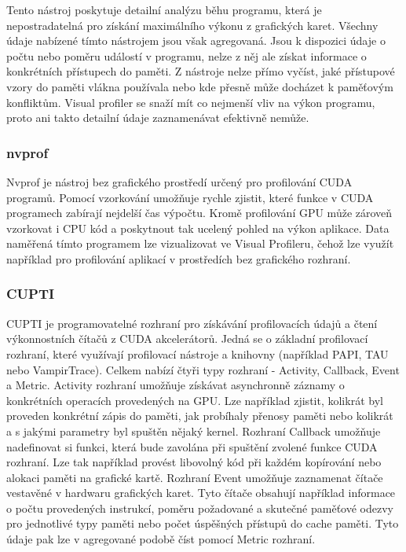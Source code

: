 Tento nástroj poskytuje detailní analýzu běhu programu, která je nepostradatelná pro získání maximálního výkonu z grafických karet. Všechny údaje nabízené tímto nástrojem jsou však agregovaná. Jsou k dispozici údaje o počtu nebo poměru událostí v programu, nelze z něj ale získat informace o konkrétních přístupech do paměti. Z nástroje nelze přímo vyčíst, jaké přístupové vzory do paměti vlákna používala nebo kde přesně může docházet k paměťovým konfliktům. 
Visual profiler se snaží mít co nejmenší vliv na výkon programu, proto ani takto detailní údaje zaznamenávat efektivně nemůže.


\subsubsection{nvprof}
Nvprof je nástroj bez grafického prostředí určený pro profilování CUDA programů. Pomocí vzorkování umožňuje rychle zjistit, které funkce v CUDA programech zabírají nejdelší čas výpočtu. Kromě profilování GPU může zároveň vzorkovat i CPU kód a poskytnout tak ucelený pohled na výkon aplikace. Data naměřená tímto programem lze vizualizovat ve Visual Profileru, čehož lze využít například pro profilování aplikací v prostředích bez grafického rozhraní. 

\subsubsection{CUPTI}
CUPTI je programovatelné rozhraní pro získávání profilovacích údajů a čtení výkonnostních čítačů z CUDA akcelerátorů. Jedná se o základní profilovací rozhraní, které využívají profilovací nástroje a knihovny (například PAPI, TAU nebo VampirTrace).
Celkem nabízí čtyři typy rozhraní - Activity, Callback, Event a Metric. Activity rozhraní umožňuje získávat asynchronně záznamy o konkrétních operacích provedených na GPU. Lze například zjistit, kolikrát byl proveden konkrétní zápis do paměti, jak probíhaly přenosy paměti nebo kolikrát a s jakými parametry byl spuštěn nějaký kernel. Rozhraní Callback umožňuje nadefinovat si funkci, která bude zavolána při spuštění zvolené funkce CUDA rozhraní. Lze tak například provést libovolný kód při každém kopírování nebo alokaci paměti na grafické kartě. Rozhraní Event umožňuje zaznamenat čítače vestavěné v hardwaru grafických karet. Tyto čítače obsahují například informace o počtu provedených instrukcí, poměru požadované a skutečné paměťové odezvy pro jednotlivé typy paměti nebo počet úspěšných přístupů do cache paměti. Tyto údaje pak lze v agregované podobě číst pomocí Metric rozhraní.

